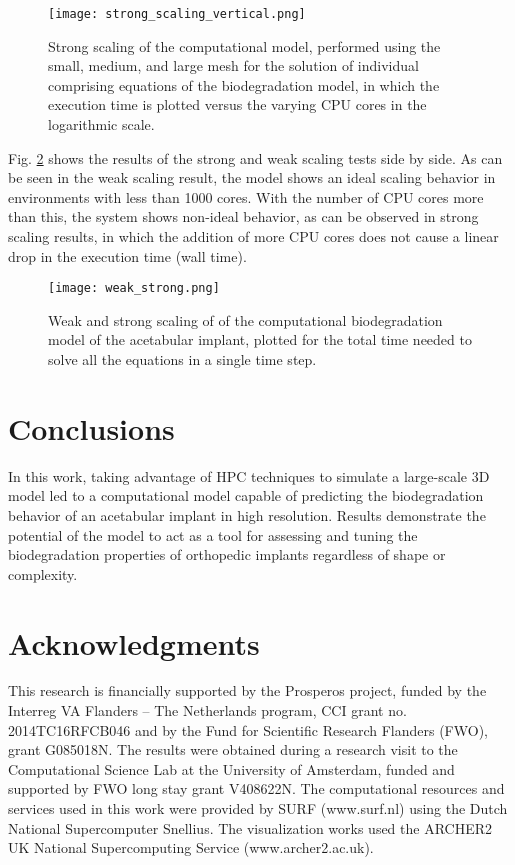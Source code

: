 \begin{figure}[h]
\centering
\medskip
\texttt{[image: strong\_scaling\_vertical.png]}
\caption[Strong scaling of individual components of the biodegradation model]{Strong scaling of the computational model, performed using the small, medium, and large mesh for the solution of individual comprising equations of the biodegradation model, in which the execution time is plotted versus the varying CPU cores in the logarithmic scale.} \label{fig:cup_strong_scaling}
\end{figure}

Fig. \ref{fig:cup_weak_strong} shows the results of the strong and weak scaling tests side by side. As can be seen in the weak scaling result, the model shows an ideal scaling behavior in environments with less than \num{1000} cores. With the number of CPU cores more than this, the system shows non-ideal behavior, as can be observed in strong scaling results, in which the addition of more CPU cores does not cause a linear drop in the execution time (wall time).


\begin{figure}[h]
\centering
\medskip
\texttt{[image: weak\_strong.png]}
\caption[Weak and strong scaling of of the acetabular implant model]{Weak and strong scaling of of the computational biodegradation model of the acetabular implant, plotted for the total time needed to solve all the equations in a single time step.} \label{fig:cup_weak_strong}
\end{figure}

\section{Conclusions}

In this work, taking advantage of HPC techniques to simulate a large-scale 3D model led to a computational model capable of predicting the biodegradation behavior of an acetabular implant in high resolution. Results demonstrate the potential of the model to act as a tool for assessing and tuning the biodegradation properties of orthopedic  implants regardless of shape or complexity.

\section{Acknowledgments}

This research is financially supported by the Prosperos project, funded by the Interreg VA Flanders – The Netherlands program, CCI grant no. 2014TC16RFCB046 and by the Fund for Scientific Research Flanders (FWO), grant G085018N. The results were obtained during a research visit to the Computational Science Lab at the University of Amsterdam, funded and supported by FWO long stay grant V408622N. The computational resources and services used in this work were provided by SURF (www.surf.nl) using the Dutch National Supercomputer Snellius. The visualization works used the ARCHER2 UK National Supercomputing Service (www.archer2.ac.uk).


